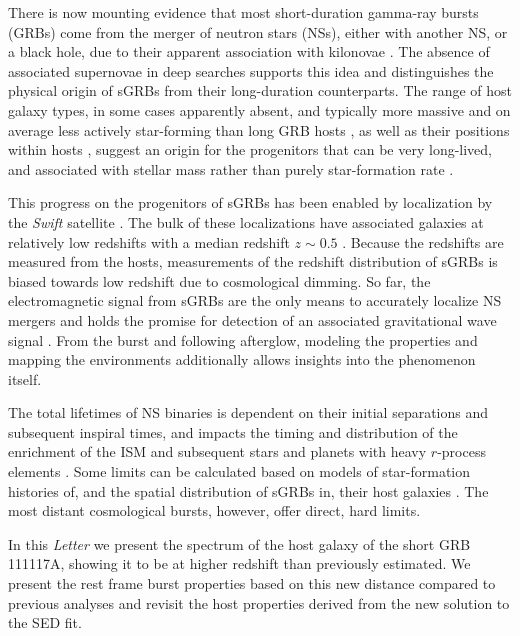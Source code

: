 \documentclass{aa}    %
\begin{document}
There is now mounting evidence that most short-duration gamma-ray bursts (GRBs) come from the merger of neutron stars (NSs), either with another NS, or a black hole, due to their apparent association with kilonovae 
\citep{Barnes2013a, Tanvir2013b, Yang2015, Jin2016, Rosswog2016}. The
absence of associated supernovae in deep searches \citep[e.g.][]
{Hjorth2005a,Fox2005,Hjorth2005b} supports this idea and distinguishes the physical origin of sGRBs from their long-duration counterparts.
The range of host galaxy types, in some cases apparently absent, and typically more massive 
and on average less actively star-forming than long GRB hosts  \citep{Fong2013b}, as well as their positions within
hosts \citep{Fong2013a}, suggest an origin for the progenitors that can be very 
long-lived, and associated with stellar mass rather than purely 
star-formation rate \citep{Berger2014}. 

This progress on the progenitors of sGRBs has been enabled by
localization by the \emph{Swift} satellite \citep{Gehrels2009a}. The bulk of these localizations have associated galaxies at relatively low redshifts with a median redshift $z\sim0.5$ \citep{Berger2014}. Because the redshifts are measured from the hosts, measurements of the redshift distribution of sGRBs is biased towards low redshift due to cosmological dimming. 
So far, the electromagnetic signal from sGRBs are the only means to accurately localize NS mergers and holds the promise for detection of an associated gravitational wave signal \citep{Ghirlanda2016}. From the burst and following afterglow, modeling the properties and mapping the environments additionally allows insights into the phenomenon itself. 

The total lifetimes of NS binaries is dependent on their initial separations and subsequent inspiral times, and impacts the timing and distribution of the enrichment of the ISM and subsequent stars and planets with heavy $r$-process elements \citep{VandeVoort2015, Wallner2015,  Ji2016}. Some limits can be calculated based on models of star-formation histories of, and the spatial distribution of sGRBs in, their host galaxies \citep[][]{Berger2014}. The most distant cosmological bursts, however, offer direct, hard limits.

In this \emph{Letter} we present the spectrum of the host galaxy of the short
GRB\,111117A, showing it to be at higher redshift than previously
estimated. We present the rest frame burst properties based on this new distance
compared to previous analyses \citep{Margutti2012,Sakamoto2013} and revisit the host properties derived from the new solution to the SED fit. 
\end{document}
